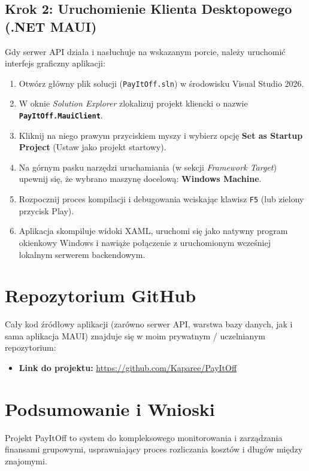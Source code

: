 \documentclass[12pt, a4paper]{article}
\begin{document}
\subsection{Krok 2: Uruchomienie Klienta Desktopowego (.NET MAUI)}
Gdy serwer API działa i nasłuchuje na wskazanym porcie, należy uruchomić interfejs graficzny aplikacji:
\begin{enumerate}
    \item Otwórz główny plik solucji (\texttt{PayItOff.sln}) w środowisku Visual Studio 2026.
    \item W oknie \textit{Solution Explorer} zlokalizuj projekt kliencki o nazwie \textbf{\texttt{PayItOff.MauiClient}}.
    \item Kliknij na niego prawym przyciskiem myszy i wybierz opcję \textbf{Set as Startup Project} (Ustaw jako projekt startowy).
    \item Na górnym pasku narzędzi uruchamiania (w sekcji \textit{Framework Target}) upewnij się, że wybrano maszynę docelową: \textbf{Windows Machine}.
    \item Rozpocznij proces kompilacji i debugowania wciskając klawisz \texttt{F5} (lub zielony przycisk Play).
    \item Aplikacja skompiluje widoki XAML, uruchomi się jako natywny program okienkowy Windows i nawiąże połączenie z uruchomionym wcześniej lokalnym serwerem backendowym.
\end{enumerate}

\section{Repozytorium GitHub}
Cały kod źródłowy aplikacji (zarówno serwer API, warstwa bazy danych, jak i sama aplikacja MAUI) znajduje się w moim prywatnym / uczelnianym repozytorium:
\begin{itemize}
    \item \textbf{Link do projektu:} \url{https://github.com/Kaparee/PayItOff}
\end{itemize}

\section{Podsumowanie i Wnioski}
Projekt PayItOff to system do kompleksowego monitorowania i zarządzania finansami grupowymi, usprawniający proces rozliczania kosztów i długów między znajomymi.
\end{document}
